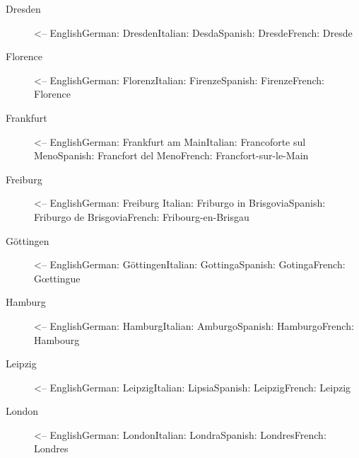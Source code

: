 \documentclass[a4paper,
10pt,
greek,
french,
spanish,
italian,
ngerman,
english,
]{ltxdoc}
\begin{document}
\begin{multicols}{3}
\begin{description}
\item[Dresden] <-- English\newline German: Dresden\newline Italian: Desda\newline Spanish: Dresde\newline French: Dresde
\item[Florence] <-- English\newline German: Florenz\newline Italian: Firenze\newline Spanish: Firenze\newline French: Florence
\item[Frankfurt] <-- English\newline German: Frankfurt am Main\newline Italian: Francoforte sul Meno\newline Spanish: Francfort del Meno\newline French: Francfort-sur-le-Main
\item[Freiburg] <-- English\newline German: Freiburg \newline Italian: Friburgo in Brisgovia\newline Spanish: Friburgo de Brisgovia\newline French: Fribourg-en-Brisgau
\item[Göttingen] <-- English\newline German: Göttingen\newline Italian: Gottinga\newline Spanish: Gotinga\newline French: Gœttingue
\item[Hamburg] <-- English\newline German: Hamburg\newline Italian: Amburgo\newline Spanish: Hamburgo\newline French: Hambourg
\item[Leipzig] <-- English\newline German: Leipzig\newline Italian: Lipsia\newline Spanish: Leipzig\newline French: Leipzig
\item[London] <-- English\newline German: London\newline Italian: Londra\newline Spanish: Londres\newline French: Londres

\end{description}
\end{multicols}
\end{document}

